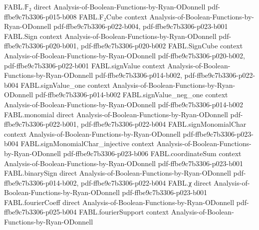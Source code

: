 \begin{theorem}
\label{FABL.SeedwiseThreeCNFReduction.isPCPP}
\leanok
{}
\proofstep
  {FABL.𝔽₂}
  {direct}
  {Analysis-of-Boolean-Functions-by-Ryan-ODonnell}
  {pdf-ffbe9c7b3306-p015-b008}
\proofstep
  {FABL.F₂Cube}
  {context}
  {Analysis-of-Boolean-Functions-by-Ryan-ODonnell}
  {pdf-ffbe9c7b3306-p022-b004,
    pdf-ffbe9c7b3306-p023-b001}
\proofstep
  {FABL.Sign}
  {context}
  {Analysis-of-Boolean-Functions-by-Ryan-ODonnell}
  {pdf-ffbe9c7b3306-p020-b001,
    pdf-ffbe9c7b3306-p020-b002}
\proofstep
  {FABL.SignCube}
  {context}
  {Analysis-of-Boolean-Functions-by-Ryan-ODonnell}
  {pdf-ffbe9c7b3306-p020-b002,
    pdf-ffbe9c7b3306-p022-b001}
\proofstep
  {FABL.signValue}
  {context}
  {Analysis-of-Boolean-Functions-by-Ryan-ODonnell}
  {pdf-ffbe9c7b3306-p014-b002,
    pdf-ffbe9c7b3306-p022-b004}
\proofstep
  {FABL.signValue_one}
  {context}
  {Analysis-of-Boolean-Functions-by-Ryan-ODonnell}
  {pdf-ffbe9c7b3306-p014-b002}
\proofstep
  {FABL.signValue_neg_one}
  {context}
  {Analysis-of-Boolean-Functions-by-Ryan-ODonnell}
  {pdf-ffbe9c7b3306-p014-b002}
\proofstep
  {FABL.monomial}
  {direct}
  {Analysis-of-Boolean-Functions-by-Ryan-ODonnell}
  {pdf-ffbe9c7b3306-p022-b001,
    pdf-ffbe9c7b3306-p022-b004}
\proofstep
  {FABL.signMonomialChar}
  {context}
  {Analysis-of-Boolean-Functions-by-Ryan-ODonnell}
  {pdf-ffbe9c7b3306-p023-b004}
\proofstep
  {FABL.signMonomialChar_injective}
  {context}
  {Analysis-of-Boolean-Functions-by-Ryan-ODonnell}
  {pdf-ffbe9c7b3306-p023-b006}
\proofstep
  {FABL.coordinateSum}
  {context}
  {Analysis-of-Boolean-Functions-by-Ryan-ODonnell}
  {pdf-ffbe9c7b3306-p023-b001}
\proofstep
  {FABL.binarySign}
  {direct}
  {Analysis-of-Boolean-Functions-by-Ryan-ODonnell}
  {pdf-ffbe9c7b3306-p014-b002,
    pdf-ffbe9c7b3306-p022-b004}
\proofstep
  {FABL.χ}
  {direct}
  {Analysis-of-Boolean-Functions-by-Ryan-ODonnell}
  {pdf-ffbe9c7b3306-p023-b001}
\proofstep
  {FABL.fourierCoeff}
  {direct}
  {Analysis-of-Boolean-Functions-by-Ryan-ODonnell}
  {pdf-ffbe9c7b3306-p025-b004}
\proofstep
  {FABL.fourierSupport}
  {context}
  {Analysis-of-Boolean-Functions-by-Ryan-ODonnell}

\end{theorem}
